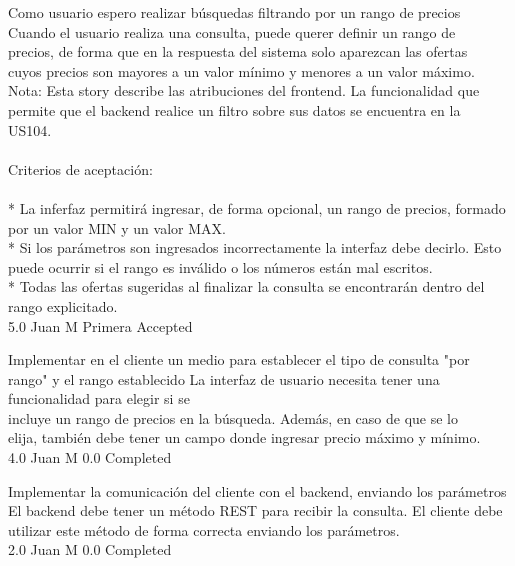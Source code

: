 	{Como usuario espero realizar búsquedas filtrando por un rango de precios} %
	{Cuando el usuario realiza una consulta, puede querer definir un rango de\\
precios, de forma que en la respuesta del sistema solo aparezcan las ofertas\\
cuyos precios son mayores a un valor mínimo y menores a un valor máximo.\\
Nota: Esta story describe las atribuciones del frontend. La funcionalidad que\\
permite que el backend realice un filtro sobre sus datos se encuentra en la\\
US104.\\
  \\
Criterios de aceptación:\\
  \\
* La inferfaz permitirá ingresar, de forma opcional, un rango de precios, formado por un valor MIN y un valor MAX.  \\
* Si los parámetros son ingresados incorrectamente la interfaz debe decirlo. Esto puede ocurrir si el rango es inválido o los números están mal escritos.\\
* Todas las ofertas sugeridas al finalizar la consulta se encontrarán dentro del rango explicitado.  \\
} %
	{} %
	{5.0} %
	{Juan M} %
	{Primera} %
	{Accepted} %

		{Implementar en el cliente un medio para establecer el tipo de consulta "por rango" y el rango establecido} %
		{La interfaz de usuario necesita tener una funcionalidad para elegir si se\\
incluye un rango de precios en la búsqueda. Además, en caso de que se lo\\
elija, también debe tener un campo donde ingresar precio máximo y mínimo.\\
} %
		{4.0} %
		{Juan M} %
		{0.0} %
		{Completed} %

		{Implementar la comunicación del cliente con el backend, enviando los parámetros} %
		{El backend debe tener un método REST para recibir la consulta. El cliente debe\\
utilizar este método de forma correcta enviando los parámetros.\\
} %
		{2.0} %
		{Juan M} %
		{0.0} %
		{Completed} %

